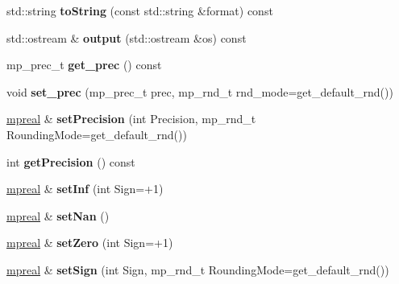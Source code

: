 \begin{DoxyCompactItemize}
std\+::string {\bfseries to\+String} (const std\+::string \&format) const
\item 
\mbox{\label{classmpfr_1_1mpreal_a3985df8c0026e1919d078bfd5ff9a755}} 
std\+::ostream \& {\bfseries output} (std\+::ostream \&os) const
\item 
\mbox{\label{classmpfr_1_1mpreal_a3a7ea3586a91489fa7509562becd304d}} 
mp\+\_\+prec\+\_\+t {\bfseries get\+\_\+prec} () const
\item 
\mbox{\label{classmpfr_1_1mpreal_a7e096c82de9a582878e55834733788bc}} 
void {\bfseries set\+\_\+prec} (mp\+\_\+prec\+\_\+t prec, mp\+\_\+rnd\+\_\+t rnd\+\_\+mode=get\+\_\+default\+\_\+rnd())
\item 
\mbox{\label{classmpfr_1_1mpreal_aef1a02c88e35bf7d6e524c587c8f04ff}} 
\hyperlink{classmpfr_1_1mpreal}{mpreal} \& {\bfseries set\+Precision} (int Precision, mp\+\_\+rnd\+\_\+t Rounding\+Mode=get\+\_\+default\+\_\+rnd())
\item 
\mbox{\label{classmpfr_1_1mpreal_ab554a180ceca6eed0e5798b316f944b0}} 
int {\bfseries get\+Precision} () const
\item 
\mbox{\label{classmpfr_1_1mpreal_a4cdc2a97eab3db526d7a4eef802fdd08}} 
\hyperlink{classmpfr_1_1mpreal}{mpreal} \& {\bfseries set\+Inf} (int Sign=+1)
\item 
\mbox{\label{classmpfr_1_1mpreal_a22dc42100dc3e65b0ab6ecc4e50b8511}} 
\hyperlink{classmpfr_1_1mpreal}{mpreal} \& {\bfseries set\+Nan} ()
\item 
\mbox{\label{classmpfr_1_1mpreal_a69cebb5059e49c332da6d0448248e974}} 
\hyperlink{classmpfr_1_1mpreal}{mpreal} \& {\bfseries set\+Zero} (int Sign=+1)
\item 
\mbox{\label{classmpfr_1_1mpreal_a4797fe1018fce0dc04fb47f754776984}} 
\hyperlink{classmpfr_1_1mpreal}{mpreal} \& {\bfseries set\+Sign} (int Sign, mp\+\_\+rnd\+\_\+t Rounding\+Mode=get\+\_\+default\+\_\+rnd())
\item 
\mbox{\label{classmpfr_1_1mpreal_a28ca7be1715bb0264f49df08050dae8a}} 

\end{DoxyCompactItemize}
